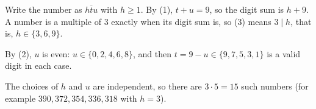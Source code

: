 Write the number as $\overline{htu}$ with $h\ge1$. By (1), $t+u=9$, so the digit sum is $h+9$. A number is a multiple of $3$ exactly when its digit sum is, so (3) means $3\mid h$, that is, $h\in\{3,6,9\}$.

By (2), $u$ is even: $u\in\{0,2,4,6,8\}$, and then $t=9-u\in\{9,7,5,3,1\}$ is a valid digit in each case.

The choices of $h$ and $u$ are independent, so there are $3\cdot5=\boxed{15}$ such numbers (for example $390,372,354,336,318$ with $h=3$).
